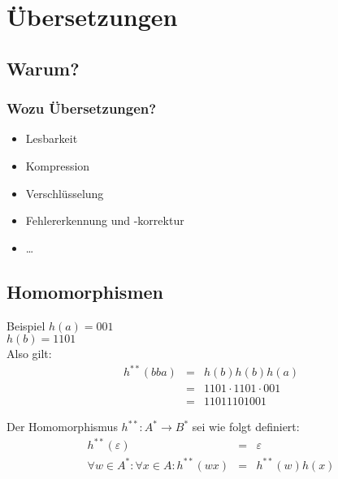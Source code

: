\section{Übersetzungen}
\subsection{Warum?}
\begin{frame}
	\frametitle{Wozu Übersetzungen?}
	\pause
	\begin{itemize}
		\item Lesbarkeit
		\item Kompression
		\item Verschlüsselung
		\item Fehlererkennung und -korrektur
		\item \dots
	\end{itemize}
\end{frame}

\subsection{Homomorphismen}
\begin{frame}
	\begin{exampleblock}{Beispiel}
		$h(a)=001$\\
		$h(b)=1101$\\
		Also gilt:
		\begin{eqnarray*}
			h^{**}(bba)&=&h(b)h(b)h(a)\\
			&=&1101\cdot 1101\cdot 001\\
			&=&11011101001
		\end{eqnarray*}
	\end{exampleblock}
	\pause
	\begin{definition}
		Der Homomorphismus $h^{**}:A^*\rightarrow B^*$ sei wie folgt definiert:
		\begin{eqnarray*}
			h^{**}(\varepsilon)&=&\varepsilon \\
			\forall w\in A^*:\forall x\in A:h^{**}(wx)&=&h^{**}(w)h(x)
		\end{eqnarray*}
	\end{definition}
\end{frame}

